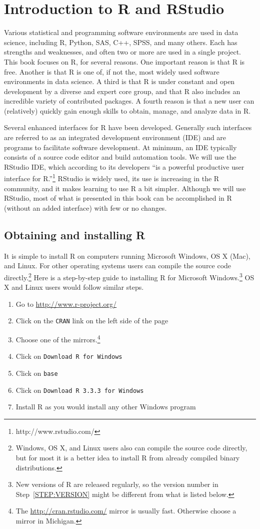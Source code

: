 \chapter{Introduction to R and RStudio}

Various statistical and programming software environments are used in data science, including R, Python, SAS, C++, SPSS, and many others. Each has strengths and weaknesses, and often two or more are used in a single project. This book focuses on R, for several reasons. One important reason is that R is free. Another is that R is one of, if not the, most widely used software environments in data science. A third is that R is under constant and open development by a diverse and expert core group, and that R also includes an incredible variety of contributed packages. A fourth reason is that a new user can (relatively) quickly gain enough skills to obtain, manage, and analyze data in R. 

Several enhanced interfaces for R have been developed. Generally such interfaces are referred to as an integrated development environment (IDE) and are programs to facilitate software development. At minimum, an IDE typically consists of a source code editor and build automation tools. We will use the RStudio IDE, which according to its developers ``is a powerful productive user interface for R.''\footnote{http://www.rstudio.com/} RStudio is widely used, its use is increasing in the R community, and it makes learning to use R a bit simpler. Although we will use RStudio, most of what is presented in this book can be accomplished in R (without an added interface) with few or no changes. 

\section{Obtaining and installing R}
It is simple to install R on computers running Microsoft Windows, OS X (Mac), and Linux. For other operating systems users can compile the source code directly.\footnote{Windows, OS X, and Linux users also can compile the source code directly, but for most it is a better idea to install R from already compiled binary distributions.}
Here is a step-by-step guide to installing R for Microsoft Windows.\footnote{New versions of R are released regularly, so the version number in Step~\ref{STEP:VERSION} might be different from what is listed below.} OS X and Linux users would follow similar steps.
\begin{enumerate}
\item Go to \url{http://www.r-project.org/}
\item Click on the \texttt{CRAN} link on the left side of the page
\item Choose one of the mirrors.\footnote{The \url{http://cran.rstudio.com/} mirror is usually fast. Otherwise choose a mirror in Michigan.}
\item Click on \texttt{Download R for Windows}
\item Click on \texttt{base}
\item \label{STEP:VERSION} Click on \texttt{Download R 3.3.3 for Windows}
\item Install R as you would install any other Windows program
\end{enumerate}
